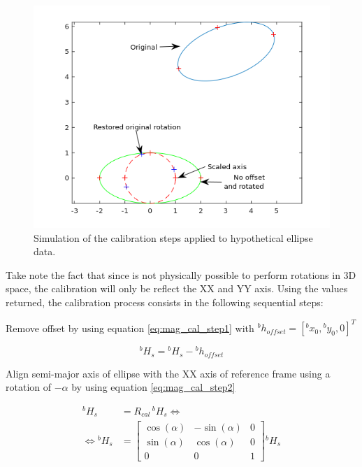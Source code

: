 \begin{figure}[!htb]
	\centering
	\includegraphics[width=0.7\linewidth]{Figures/mag_calibration_steps.png}
	\caption[Calibration steps of ellipse data]{Simulation of the calibration steps applied to hypothetical ellipse data.}
	\label{fig:mag_cal_steps_fig}
\end{figure}

Take note the fact that since is not physically possible to perform rotations in
3D space, the calibration will only be reflect the XX and YY axis. Using the
values returned, the calibration process consists in the following sequential
steps:

 Remove offset by using equation \eqref{eq:mag_cal_step1} with ${}^bh_{offset} = [{}^bx_0, {}^by_0, 0]^T$

\begin{equation}
{}^bH_{s}={}^bH_{s}-{}^bh_{offset}
\label{eq:mag_cal_step1}
\end{equation}

 Align semi-major axis of ellipse with the XX axis of reference frame using a rotation of $-\alpha$ by using equation \eqref{eq:mag_cal_step2}

\begin{equation}
\begin{aligned}
{}^bH_{s}&=R_{cal}\,{}^bH_{s}\Leftrightarrow\\
\Leftrightarrow{}^bH_{s}&=\begin{bmatrix}
\cos(\alpha) & -\sin(\alpha) & 0\\
\sin(\alpha) & \cos(\alpha)  & 0\\
0			 & 0			 & 1
\end{bmatrix}{}^bH_{s}
\end{aligned}
\label{eq:mag_cal_step2}
\end{equation}

